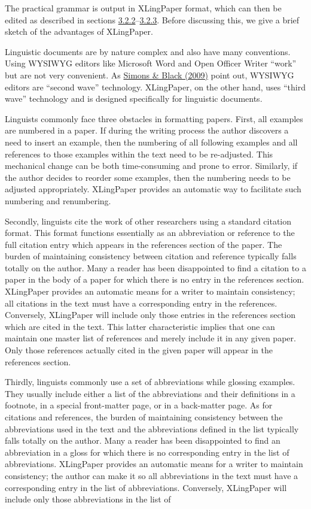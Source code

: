 \documentclass[12pt]{article}
\begin{document}
The practical grammar is output in {XLingPaper} format, which can then be edited as described in sections \hyperlink{sXLingPaperOutputs}{3.2.2}–\hyperlink{sXMLMind}{3.2.3}.  Before discussing this, we give a brief sketch of the advantages of {XLingPaper}.\par{}\indent Linguistic documents are by nature complex and also have many conventions. Using WYSIWYG editors like Microsoft Word and Open Officer Writer “work” but are not very convenient. As \hyperlink{rSimonsAndBlackSFLF}{Simons \& Black (2009)} point out, WYSIWYG editors are “second wave” technology. {XLingPaper}, on the other hand, uses “third wave” technology and is designed specifically for linguistic documents.\par{}\indent Linguists commonly face three obstacles in formatting papers. First, all examples are numbered in a paper. If during the writing process the author discovers a need to insert an example, then the numbering of all following examples and all references to those examples within the text need to be re-adjusted. This mechanical change can be both time-consuming and prone to error. Similarly, if the author decides to reorder some examples, then the numbering needs to be adjusted appropriately. {XLingPaper} provides an automatic way to facilitate such numbering and renumbering. \par{}\indent Secondly, linguists cite the work of other researchers using a standard citation format. This format functions essentially as an abbreviation or reference to the full citation entry which appears in the references section of the paper. The burden of maintaining consistency between citation and reference typically falls totally on the author. Many a reader has been disappointed to find a citation to a paper in the body of a paper for which there is no entry in the references section. {XLingPaper} provides an automatic means for a writer to maintain consistency; all citations in the text must have a corresponding entry in the references. Conversely, {XLingPaper} will include only those entries in the references section which are cited in the text. This latter characteristic implies that one can maintain one master list of references and merely include it in any given paper. Only those references actually cited in the given paper will appear in the references section. \par{}\indent Thirdly, linguists commonly use a set of abbreviations while glossing examples. They usually include either a list of the abbreviations and their definitions in a footnote, in a special front-matter page, or in a back-matter page. As for citations and references, the burden of maintaining consistency between the abbreviations used in the text and the abbreviations defined in the list typically falls totally on the author. Many a reader has been disappointed to find an abbreviation in a gloss for which there is no corresponding entry in the list of abbreviations. {XLingPaper} provides an automatic means for a writer to maintain consistency; the author can make it so all abbreviations in the text must have a corresponding entry in the list of abbreviations. Conversely, {XLingPaper} will include only those abbreviations in the list of 
\end{document}
